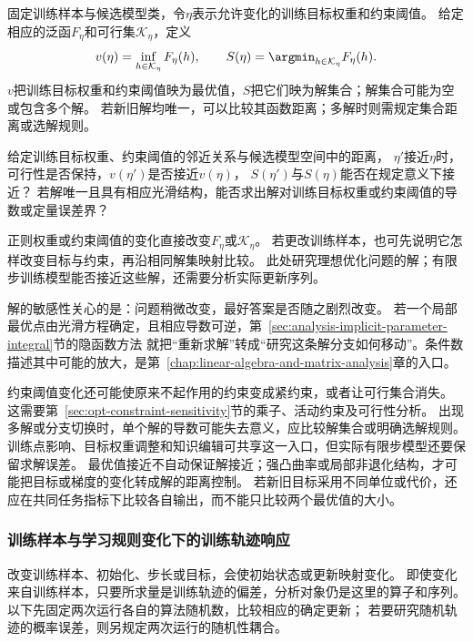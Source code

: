 固定训练样本与候选模型类，令$\eta$表示允许变化的训练目标权重和约束阈值。
给定相应的泛函$F_\eta$和可行集$\mathcal K_\eta$，定义
\[
  v(\eta)=\inf_{h\in\mathcal K_\eta}F_\eta(h),\qquad
  S(\eta)=\argmin_{h\in\mathcal K_\eta}F_\eta(h).
\]
$v$把训练目标权重和约束阈值映为最优值，$S$把它们映为解集合；解集合可能为空或包含多个解。
若新旧解均唯一，可以比较其函数距离；多解时则需规定集合距离或选解规则。

\begin{mathproblem}[训练目标与约束变化造成的最优值与解集差异]
  \label{question:future-solution-sensitivity}
  给定训练目标权重、约束阈值的邻近关系与候选模型空间中的距离，
  $\eta'$接近$\eta$时，可行性是否保持，$v(\eta')$是否接近$v(\eta)$，
  $S(\eta')$与$S(\eta)$能否在规定意义下接近？
  若解唯一且具有相应光滑结构，能否求出解对训练目标权重或约束阈值的导数或定量误差界？
\end{mathproblem}

正则权重或约束阈值的变化直接改变$F_\eta$或$\mathcal K_\eta$。
若更改训练样本，也可先说明它怎样改变目标与约束，再沿相同解集映射比较。
此处研究理想优化问题的解；有限步训练模型能否接近这些解，还需要分析实际更新序列。

解的敏感性关心的是：问题稍微改变，最好答案是否随之剧烈改变。
若一个局部最优点由光滑方程确定，且相应导数可逆，第~\ref{sec:analysis-implicit-parameter-integral}节的隐函数方法
就把“重新求解”转成“研究这条解分支如何移动”。条件数描述其中可能的放大，是第~\ref{chap:linear-algebra-and-matrix-analysis}章的入口。

约束阈值变化还可能使原来不起作用的约束变成紧约束，或者让可行集合消失。
这需要第~\ref{sec:opt-constraint-sensitivity}节的乘子、活动约束及可行性分析。
出现多解或分支切换时，单个解的导数可能失去意义，应比较解集合或明确选解规则。
训练点影响、目标权重调整和知识编辑可共享这一入口，但实际有限步模型还要保留求解误差。
最优值接近不自动保证解接近；强凸曲率或局部非退化结构，才可能把目标或梯度的变化转成解的距离控制。
若新旧目标采用不同单位或代价，还应在共同任务指标下比较各自输出，而不能只比较两个最优值的大小。

\subsubsection{训练样本与学习规则变化下的训练轨迹响应}
\label{sec:future-analysis-iteration-perturbation}

改变训练样本、初始化、步长或目标，会使初始状态或更新映射变化。
即使变化来自训练样本，只要所求量是训练轨迹的偏差，分析对象仍是这里的算子和序列。
以下先固定两次运行各自的算法随机数，比较相应的确定更新；
若要研究随机轨迹的概率误差，则另规定两次运行的随机性耦合。

